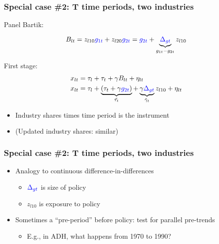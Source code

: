 \documentclass[notes,11pt, aspectratio=169]{beamer}
\begin{document}
  
  
  
  
  
  \begin{frame}
  \frametitle{Special case \#2:  T time periods, two industries }
  
  
  
  Panel Bartik:
  
  $$B_{lt} = z_{l10} \textcolor{blue}{g_{1t}}  +z_{l20} \textcolor{blue}{g_{2t}} = \textcolor{blue}{g_{2t}} + \underbrace{ \textcolor{blue}{\Delta_{gt}}}_{g_{1t}-g_{2t}} z_{l10}$$
  
  
  
  
  First stage:
  \begin{align}
  x_{lt} & =\tau_{l}+\tau_{t}+ \gamma B_{lt} +\eta_{lt} \notag\\
  x_{lt} & =\tau_{l}+\underbrace{(\tau_{t}+\gamma \textcolor{blue}{g_{2t}})}_{\tilde{\tau_{t}}}+\underbrace{\gamma  \textcolor{blue}{\Delta_{gt}}}_{\tilde{\gamma}_{t}}z_{l10}+\eta_{lt} \notag
  \end{align}
  
  
  
  
  \begin{itemize}
  \item Industry shares times time period is the instrument
  \item (Updated industry shares: similar)
  \end{itemize}
  
  
  \end{frame}
  
  
  
  \begin{frame}
  \frametitle{Special case \#2:  T time periods, two industries }
  
  \begin{itemize}
    \setlength\itemsep{1em}
  \item Analogy to continuous difference-in-differences 
    \begin{itemize}
    \setlength\itemsep{1em}
    \item $\textcolor{blue}{\Delta_{gt}}$ is size of policy 
    \item $z_{l10}$ is exposure to policy
    \end{itemize} 
  \item Sometimes a ``pre-period'' before policy: test for parallel pre-trends 
    \begin{itemize}
    \setlength\itemsep{1em}
    \item E.g., in ADH, what happens from 1970 to 1990?
    \end{itemize}
  \end{itemize}
  \end{frame}
  
\end{document}
